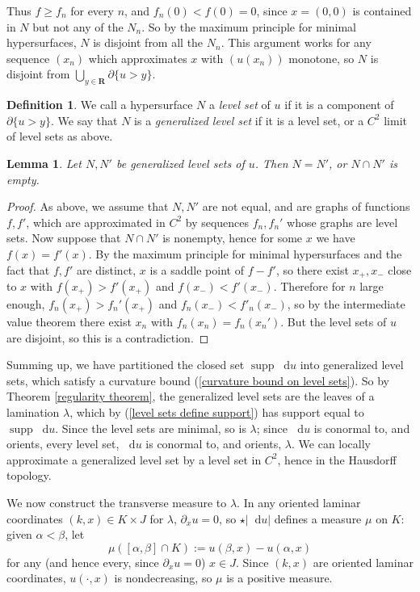 \documentclass[reqno,11pt]{amsart}
\newcommand{\RR}{\mathbf{R}}
\newcommand*\dif{\mathop{}\!\mathrm{d}}
\DeclareMathOperator{\supp}{supp}
\newcommand{\dfn}[1]{\emph{#1}\index{#1}}
\newtheorem{lemma}[theorem]{Lemma}
\theoremstyle{definition}
\newtheorem{definition}[theorem]{Definition}
\numberwithin{equation}{section}
\begin{document}
Thus $f \geq f_n$ for every $n$, and $f_n(0) < f(0) = 0$, since $x = (0, 0)$ is contained in $N$ but not any of the $N_n$.
So by the maximum principle for minimal hypersurfaces, $N$ is disjoint from all the $N_n$.
This argument works for any sequence $(x_n)$ which approximates $x$ with $(u(x_n))$ monotone, so $N$ is disjoint from $\bigcup_{y \in \RR} \partial \{u > y\}$.

\begin{definition}
We call a hypersurface $N$ a \dfn{level set} of $u$ if it is a component of $\partial \{u > y\}$.
We say that $N$ is a \dfn{generalized level set} if it is a level set, or a $C^2$ limit of level sets as above.
\end{definition}

\begin{lemma}
Let $N, N'$ be generalized level sets of $u$.
Then $N = N'$, or $N \cap N'$ is empty.
\end{lemma}
\begin{proof}
As above, we assume that $N, N'$ are not equal, and are graphs of functions $f, f'$, which are approximated in $C^2$ by sequences $f_n, f_n'$ whose graphs are level sets.
Now suppose that $N \cap N'$ is nonempty, hence for some $x$ we have $f(x) = f'(x)$.
By the maximum principle for minimal hypersurfaces and the fact that $f, f'$ are distinct, $x$ is a saddle point of $f - f'$, so there exist $x_+, x_-$ close to $x$ with $f(x_+) > f'(x_+)$ and $f(x_-) < f'(x_-)$.
Therefore for $n$ large enough, $f_n(x_+) > f_n'(x_+)$ and $f_n(x_-) < f'_n(x_-)$, so by the intermediate value theorem there exist $x_n$ with $f_n(x_n) = f_n(x_n')$.
But the level sets of $u$ are disjoint, so this is a contradiction.
\end{proof}

Summing up, we have partitioned the closed set $\supp \dif u$ into generalized level sets, which satisfy a curvature bound (\ref{curvature bound on level sets}).
So by Theorem \ref{regularity theorem}, the generalized level sets are the leaves of a lamination $\lambda$, which by (\ref{level sets define support}) has support equal to $\supp \dif u$.
Since the level sets are minimal, so is $\lambda$; since $\dif u$ is conormal to, and orients, every level set, $\dif u$ is conormal to, and orients, $\lambda$.
We can locally approximate a generalized level set by a level set in $C^2$, hence in the Hausdorff topology.

We now construct the transverse measure to $\lambda$.
In any oriented laminar coordinates $(k, x) \in K \times J$ for $\lambda$, $\partial_x u = 0$, so $\star |\dif u|$ defines a measure $\mu$ on $K$: given $\alpha < \beta$, let
$$\mu([\alpha, \beta] \cap K) := u(\beta, x) - u(\alpha, x)$$
for any (and hence every, since $\partial_x u = 0$) $x \in J$.
Since $(k, x)$ are oriented laminar coordinates, $u(\cdot, x)$ is nondecreasing, so $\mu$ is a positive measure.
\end{document}
